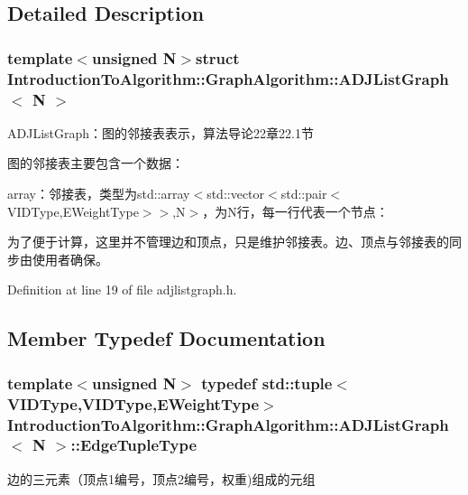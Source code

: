 \subsection{Detailed Description}
\subsubsection*{template$<$unsigned N$>$struct Introduction\+To\+Algorithm\+::\+Graph\+Algorithm\+::\+A\+D\+J\+List\+Graph$<$ N $>$}

A\+D\+J\+List\+Graph：图的邻接表表示，算法导论22章22.1节 

图的邻接表主要包含一个数据：


\begin{DoxyItemize}
\item {\ttfamily array}：邻接表，类型为{\ttfamily std\+::array$<$std\+::vector$<$std\+::pair$<$V\+I\+D\+Type,E\+Weight\+Type$>$$>$,N$>$}，为{\ttfamily N}行，每一行代表一个节点：
\end{DoxyItemize}

为了便于计算，这里并不管理边和顶点，只是维护邻接表。边、顶点与邻接表的同步由使用者确保。 

Definition at line 19 of file adjlistgraph.\+h.



\subsection{Member Typedef Documentation}
\hypertarget{struct_introduction_to_algorithm_1_1_graph_algorithm_1_1_a_d_j_list_graph_a6757574602df8359b10e37079c789eb6}{}
\subsubsection[{Edge\+Tuple\+Type}]{\setlength{\rightskip}{0pt plus 5cm}template$<$unsigned N$>$ typedef std\+::tuple$<${\bf V\+I\+D\+Type},{\bf V\+I\+D\+Type},{\bf E\+Weight\+Type}$>$ {\bf Introduction\+To\+Algorithm\+::\+Graph\+Algorithm\+::\+A\+D\+J\+List\+Graph}$<$ N $>$\+::{\bf Edge\+Tuple\+Type}}\label{struct_introduction_to_algorithm_1_1_graph_algorithm_1_1_a_d_j_list_graph_a6757574602df8359b10e37079c789eb6}
边的三元素（顶点1编号，顶点2编号，权重)组成的元组 

